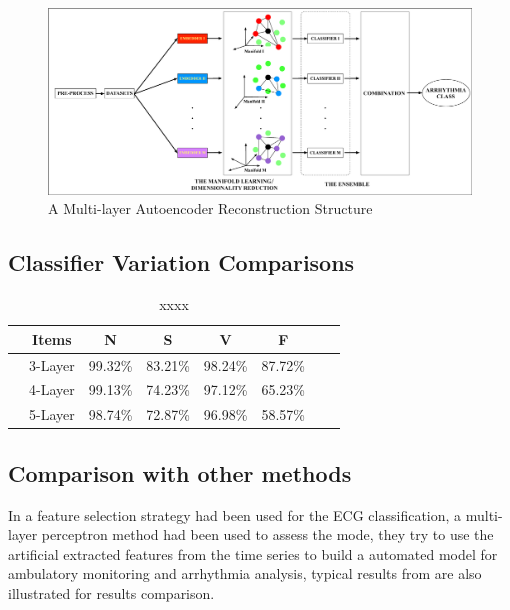 \documentclass[journal]{IEEEtran}
\begin{document}
\lipsum


\begin{figure}[!htbp]
\includegraphics[width=7in]{EPS/systemStructure.eps}
\caption{A Multi-layer Autoencoder Reconstruction Structure}
\end{figure}



  
\subsection{Classifier Variation Comparisons}
\begin{table}[!htbp]
\begin{center}
\begin{threeparttable}
\caption{xxxx}
\label{aeresults}
\begin{tabular}{cccccccc}
\hline
&  Items & N & S & V & F   \\
\hline
&3-Layer  &99.32\% & 83.21\% &98.24\% &  87.72\%  \\
&4-Layer  &99.13\% & 74.23\%  & 97.12\% & 65.23\%       \\
&5-Layer &98.74\% & 72.87\% & 96.98\% &  58.57\% \\
\hline
\end{tabular}
\end{threeparttable}
\end{center}
\end{table}

  
   

\subsection{Comparison with other methods}
In \cite{mar} a feature selection strategy had been used for the ECG classification, a multi-layer perceptron method had been used to assess the mode, they try to use the artificial extracted features from the time series to build a automated model for ambulatory monitoring and arrhythmia analysis, typical results from \cite{chaza, melgan, jiang} are also illustrated for results comparison.
\end{document}
